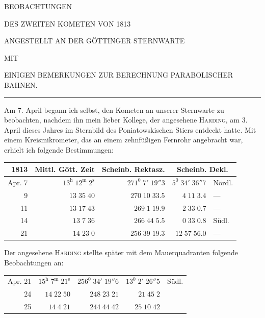 \renewcommand{\Article}[1]{\par\medskip\Needspace{4\baselineskip}\pdfbookmark[1]{Art. #1}{cometae-art-#1}\centerline{\textbf{#1.}}\nobreak\smallskip}
\begin{center}
{\large BEOBACHTUNGEN}\par\medskip
{\Large DES ZWEITEN KOMETEN VON 1813}\par\medskip
ANGESTELLT AN DER GÖTTINGER STERNWARTE\par\medskip
MIT\par\medskip
EINIGEN BEMERKUNGEN ZUR BERECHNUNG PARABOLISCHER BAHNEN.\par\smallskip
\rule{.09\linewidth}{.3pt}
\end{center}

Am 7. April begann ich selbst, den Kometen an unserer Sternwarte zu beobachten, nachdem ihn mein lieber Kollege, der angesehene \textsc{Harding}, am 3. April dieses Jahres im Sternbild des Poniatowskischen Stiers entdeckt hatte. Mit einem Kreismikrometer, das an einem zehnfüßigen Fernrohr angebracht war, erhielt ich folgende Bestimmungen:
\begin{center}\small\setlength{\tabcolsep}{4pt}
\begin{tabular}{r|r|r|r l}
1813&Mittl. Gött. Zeit&Scheinb. Rektasz.&\multicolumn{2}{c}{Scheinb. Dekl.}\\\hline
Apr. 7&$13^{\mathrm h}\;12^{\mathrm m}\;2^{\mathrm s}$&$271^0\;7'\;19''3$&$5^0\;34'\;36''7$&Nördl.\\
9&$13\;35\;40$&$270\;10\;33.5$&$4\;11\;3.4$&—\\
11&$13\;17\;43$&$269\;1\;19.9$&$2\;33\;0.7$&—\\
14&$13\;7\;36$&$266\;44\;5.5$&$0\;33\;0.8$&Südl.\\
21&$14\;23\;0$&$256\;39\;19.3$&$12\;57\;56.0$&—
\end{tabular}\end{center}

Der angesehene \textsc{Harding} stellte später mit dem Mauerquadranten folgende Beobachtungen an:
\begin{center}\small\setlength{\tabcolsep}{4pt}
\begin{tabular}{r|r|r|r l}
Apr. 21&$15^{\mathrm h}\;7^{\mathrm m}\;21^{\mathrm s}$&$256^0\;34'\;19''6$&$13^0\;2'\;26''5$&Südl.\\
24&$14\;22\;50$&$248\;23\;21$&$21\;45\;2$&\\
25&$14\;4\;21$&$244\;44\;42$&$25\;10\;42$&
\end{tabular}\end{center}

